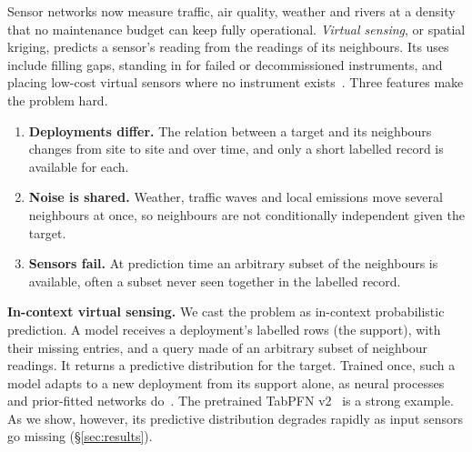 \documentclass{article}
\begin{document}
Sensor networks now measure traffic, air quality, weather and rivers at a density that no maintenance budget can keep
fully operational. \emph{Virtual sensing}, or spatial kriging, predicts a sensor's reading from the readings of its
neighbours. Its uses include filling gaps, standing in for failed or decommissioned instruments, and placing
low-cost virtual sensors where no instrument exists~\citep{wu2021ignnk,cini2022grin}. Three features make the problem
hard.
\begin{enumerate}
  \item \textbf{Deployments differ.} The relation between a target and its neighbours changes from site to site and
  over time, and only a short labelled record is available for each.
  \item \textbf{Noise is shared.} Weather, traffic waves and local emissions move several neighbours at once, so
  neighbours are not conditionally independent given the target.
  \item \textbf{Sensors fail.} At prediction time an arbitrary subset of the neighbours is available, often a subset
  never seen together in the labelled record.
\end{enumerate}

\textbf{In-context virtual sensing.} We cast the problem as in-context probabilistic prediction. A model receives a
deployment's labelled rows (the support), with their missing entries, and a query made of an arbitrary subset of
neighbour readings. It returns a predictive distribution for the target. Trained once, such a model adapts to a new
deployment from its support alone, as neural processes~\citep{garnelo2018cnp,nguyen2022tnp} and prior-fitted networks
do~\citep{muller2022pfn,hollmann2025tabpfnv2}. The pretrained TabPFN v2~\citep{hollmann2025tabpfnv2} is a strong
example. As we show, however, its predictive distribution degrades rapidly as input sensors go missing
(\S\ref{sec:results}).
\end{document}
